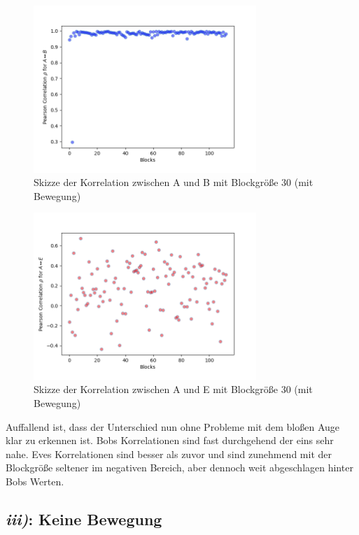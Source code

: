 \documentclass[12pt,a4paper]{article}
\begin{document}
\begin{figure}[hbt!]
	\centering
		\includegraphics[width=0.75\textwidth ]
		{Bilder/a3-t2-block30-correlation-AB.png}
		\caption{Skizze der Korrelation zwischen A und B mit Blockgröße 30 (mit Bewegung)}
		\label{fig:Label6}
\end{figure}

\begin{figure}[hbt!]
	\centering
		\includegraphics[width=0.75\textwidth ]
		{Bilder/a3-t2-block30-correlation-AE.png}
		\caption{Skizze der Korrelation zwischen A und E mit Blockgröße 30 (mit Bewegung)}
		\label{fig:Label7}
\end{figure}



Auffallend ist, dass der Unterschied nun ohne Probleme mit dem bloßen 
Auge klar zu erkennen ist. Bobs Korrelationen sind fast durchgehend 
der eins sehr nahe. Eves Korrelationen sind besser als zuvor und 
sind zunehmend mit der Blockgröße seltener im negativen Bereich, aber 
dennoch weit abgeschlagen hinter Bobs Werten.


\subsection*{\textit{iii)}: Keine Bewegung}
\end{document}
